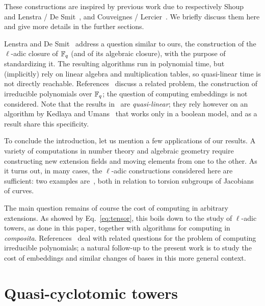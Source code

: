 \documentclass{sig-alternate}
\begin{document}
These constructions are inspired by previous work due to respectively
Shoup~\cite{Shoup90,shoup94} and Lenstra / De
Smit~\cite{lenstra+desmit08-stdmodels}, and Couveignes /
Lercier~\cite{couveignes+lercier11}. We briefly discuss them here and
give more details in the further sections.

Lenstra and De Smit~\cite{lenstra+desmit08-stdmodels} address a
question similar to ours, the construction of the $\ell$-adic closure
of $\mathbb{F}_q$ (and of its algebraic closure), with the purpose of
standardizing it. The resulting algorithms run in
polynomial time, but (implicitly) rely on linear algebra and
multiplication tables, so quasi-linear time is not directly reachable.
References~\cite{Shoup90,shoup94,couveignes+lercier11} discuss a
related problem, the construction of irreducible polynomials over
$\mathbb{F}_q$; the question of computing embeddings is not considered.  Note
that the results in~\cite{couveignes+lercier11} are {\em
  quasi-linear}; they rely however on an algorithm by Kedlaya and
Umans~\cite{KeUm11} that works only in a boolean model, and as a
result share this specificity.

To conclude the introduction, let us mention a few applications of our
results. A variety of computations in number theory and algebraic
geometry require constructing new extension fields and moving elements
from one to the other. As it turns out, in many cases, the $\ell$-adic
constructions considered here are sufficient: two examples
are~\cite{df10,GaSc12}, both in relation to torsion subgroups of
Jacobians of curves.

The main question remains of course the cost of computing in arbitrary
extensions. As showed by Eq.~\eqref{eq:tensor}, this boils down to the
study of $\ell$-adic towers, as done in this paper, together with
algorithms for computing in \emph{composita}.
References~\cite{Shoup90,shoup94,couveignes+lercier11} deal with
related questions for the problem of computing irreducible polynomials;
a natural follow-up to the present work is to study the cost of
embeddings and similar changes of bases in this more general context.


\section{Quasi-cyclotomic towers}
\label{sec:LDtower}
\end{document}
